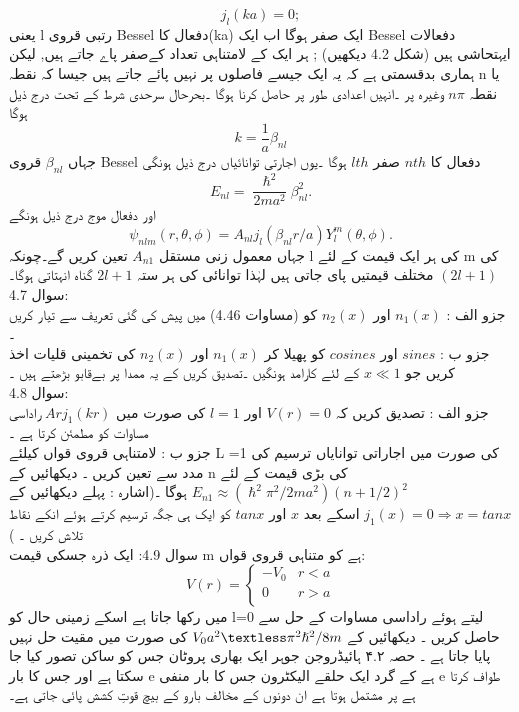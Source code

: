 \documentclass{book}
\begin{document}
\[j_{l}(ka)=0;\]
یعنی l رتبی قروی Bessel دفعال کا(ka) ایک صفر ہوگا اب ایک Bessel دفعالات ایہتحاشی ہیں (شکل 4.2 دیکھیں) ; ہر ایک کے لامتناہی تعداد کےصفر پاے جاتے ہیں, لیکن ہماری بدقسمتی ہے کہ یہ ایک جیسے فاصلوں پر نہیں پائے جاتے ہیں جیسا کہ نقطہ n یا نقطہ
\(n\pi\)
وغیرہ پر ۔انہیں اعدادی طور پر حاصل کرنا ہوگا ۔بحرحال سرحدی شرط کے تحت درج ذیل ہوگا \\
\[k=\frac{1}{a}\beta_{nl}\]
جہاں
\(\beta_{nl}\)
قروی Bessel دفعال کا
\(nth\)
صفر
\(lth\)
ہوگا ۔یوں اجارتی توانائیاں درج ذیل ہونگی \\
\[E_{nl}=\frac{\hslash^{2}}{2ma^{2}}\beta_{nl}^{2}.\]
اور دفعال موج درج ذیل ہونگے\\ 
\[\psi_{nlm}(r,\theta,\phi)=A_{nl}j_{l}(\beta_{nl}r/a)Y_{l}^{m}(\theta,\phi).\]
جہاں معمول زنی مستقل 
\(A_{n1}\)
 تعین کریں گے۔چونکہ l کی ہر ایک قیمت کے لئے m کی
\((2l+1)\)
مختلف قیمتیں پای جاتی ہیں لہٰذا توانائی کی ہر ستہ
\(2l+1\)
گناہ انہتاتی ہوگا۔\\
سوال 4.7:\\
جزو الف :
\(n_{1}(x)\)
اور
\(n_{2}(x)\)
کو (مساوات 4.46) میں پیش کی گئی تعریف سے تیار کریں ۔\\
جزو ب :
\(sines\)
اور
\(cosines\)
کو پھیلا کر
\(n_{1}(x)\)
اور
\(n_{2}(x)\)
کی تخمینی قلیات اخذ کریں جو
\(x\ll1\)
کے لئے كارامد ہونگیں ۔تصدیق کریں کے یہ ممدا پر بےقابو بڑھتے ہیں ۔\\
سوال 4.8:\\
جزو الف : تصدیق کریں کہ
\(V(r)=0\)
اور
\(l=1\)
کی صورت میں
\(Arj_{1}(kr)\)
راداسی مساوات کو مطمئن كرتا ہے ۔\\
جزو ب : لامتناہی قروی قواں کیلئے L =1 کی صورت میں اجاراتی توانایاں ترسیم کی مدد سے تعین کریں ۔ دیکھائیں کے n کی بڑی قیمت کے لئے 
\(E_{n1}\approx(\hslash^{2}\pi^{2}/2ma^{2})(n+1/2)^{2}\)
ہوگا ۔(اشارہ : پہلے دیکھائیں کے
\(j_{1}(x)=0\Rightarrow{x}=tanx\)
اسکے بعد
\(x\)
اور
\(tanx\)
کو ایک ہی جگہ ترسیم کرتے ہوئے انکے نقاط تلاش کریں ۔ ) \\
سوال 4.9: ایک ذرہ جسکی قیمت m ہے کو متناہی قروی قواں:
\[V(r)=\begin{cases}-V_{0}&r<a\\0&r>a\\\end{cases}\]
میں رکھا جاتا ہے اسکے زمینی حال کو l=0 لیتے ہوئے راداسی مساوات کے حل سے حاصل کریں ۔ دیکھائیں کے
\(V_{0}a^{2}\textless\pi^{2}\hslash^{2}/8m\)
کی صورت میں مقیت حل نہیں پایا جاتا ہے ۔
حصہ ۴.۲
ہائیڈروجن جوہر ایک بھاری پروٹان جس کو ساکن تصور کیا جا سکتا ہے اور جس کا بار e ہے کے  گرد ایک حلقے الیکٹرون جس کا بار منفی e طواف کرتا ہے پر مشتمل ہوتا ہے ان دونوں کے مخالف بارو کے بیچ قوتِ کشش پائی جاتی ہے۔
\end{document}
